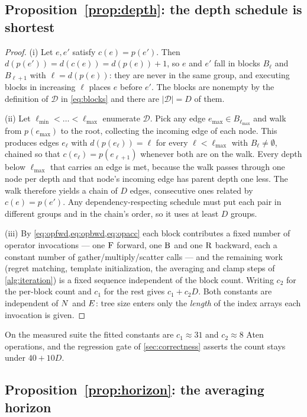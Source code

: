 \subsection{Proposition~\ref{prop:depth}: the depth schedule is shortest}

\begin{proof}
(i) Let $e, e'$ satisfy $c(e) = p(e')$. Then $d(p(e')) = d(c(e)) = d(p(e)) + 1$, so $e$
and $e'$ fall in blocks $B_\ell$ and $B_{\ell+1}$ with $\ell = d(p(e))$: they are never
in the same group, and executing blocks in increasing $\ell$ places $e$ before $e'$.
The blocks are nonempty by the definition of $\mathcal{D}$ in \cref{eq:blocks} and there
are $|\mathcal{D}| = D$ of them.

(ii) Let $\ell_{\min} < \dots < \ell_{\max}$ enumerate $\mathcal{D}$. Pick any edge
$e_{\max} \in B_{\ell_{\max}}$ and walk from $p(e_{\max})$ to the root, collecting the
incoming edge of each node. This produces edges $e_{\ell}$ with $d(p(e_\ell)) = \ell$
for every $\ell < \ell_{\max}$ with $B_\ell \neq \emptyset$, chained so that
$c(e_\ell) = p(e_{\ell+1})$ whenever both are on the walk. Every depth below
$\ell_{\max}$ that carries an edge is met, because the walk passes through one node per
depth and that node's incoming edge has parent depth one less. The walk therefore yields
a chain of $D$ edges, consecutive ones related by $c(e) = p(e')$. Any
dependency-respecting schedule must put each pair in different groups and in the chain's
order, so it uses at least $D$ groups.

(iii) By \cref{eq:opfwd,eq:opbwd,eq:opacc} each block contributes a fixed number of
operator invocations --- one $\mathrm{F}$ forward, one $\mathrm{B}$ and one $\mathrm{R}$ backward, each a
constant number of gather/multiply/scatter calls --- and the remaining work (regret
matching, template initialization, the averaging and clamp steps of
\cref{alg:iteration}) is a fixed sequence independent of the block count. Writing $c_2$
for the per-block count and $c_1$ for the rest gives $c_1 + c_2 D$. Both constants are
independent of $N$ and $E$: tree size enters only the \emph{length} of the
index arrays each invocation is given.
\end{proof}

On the measured suite the fitted constants are $c_1 \approx 31$ and
$c_2 \approx 8$ Aten operations, and the regression gate of \cref{sec:correctness}
asserts the count stays under $40 + 10D$.

\subsection{Proposition~\ref{prop:horizon}: the averaging horizon}

